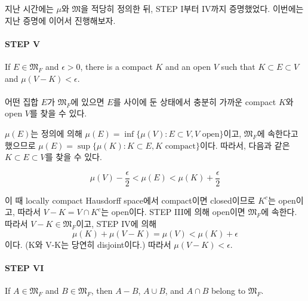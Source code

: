 \documentclass[11pt,reqno]{amsart}
\renewcommand{\(}{\left(}
\renewcommand{\)}{\right)}
\renewcommand{\[}{\left[}
\renewcommand{\]}{\right]}
\newcommand{\ep}{\epsilon}
\newcommand{\subheading}[1]{\vspace{1em}{\noindent\large\bfseries \textlangle{} #1 \textrangle{} \par}\vspace{1em}}
\newcommand{\M}{\mathfrak{M}}
\begin{document}
지난 시간에는 $\mu$와 $\M$을 적당히 정의한 뒤, STEP I부터 IV까지 증명했었다. 이번에는 지난 증명에 이어서 진행해보자.

\paragraph{STEP V}

If $E \in \M_F$ and $\ep > 0$, there is a compact $K$ and an open $V$ such that $K \subset E \subset V$ 
and $\mu (V - K) < \ep$. \\ \\

어떤 집합 $E$가 $\M_F$에 있으면 $E$를 사이에 둔 상태에서 충분히 가까운 compact $K$와 open $V$를 찾을 수 있다.

\subheading{proof}

$\mu(E)$는 정의에 의해 $\mu(E) = \inf\{ \mu(V) : E \subset V, V \text{ open} \}$이고, $\M_F$에 속한다고 했으므로 
$\mu(E) = \sup\{ \mu(K) : K \subset E, K \text{ compact} \}$이다. 따라서, 다음과 같은 
$K \subset E \subset V$를 찾을 수 있다.

\begin{equation*}
  \mu(V) - \frac{\ep}{2} < \mu(E) < \mu(K) + \frac{\ep}{2}
\end{equation*}

이 때 locally compact Hausdorff space에서 compact이면 closed이므로 $K^c$는 open이고, 따라서 
$V - K = V \cap K^c$는 open이다. STEP III에 의해 open이면 $\M_F$에 속한다. 따라서 $V - K \in \M_F$이고, 
STEP IV에 의해
\begin{equation*}
  \mu (K) + \mu(V-K) = \mu(V) < \mu(K) + \ep
\end{equation*}
이다. (K와 V-K는 당연히 disjoint이다.) 따라서 $\mu(V-K) < \ep$.

\paragraph{STEP VI}

If $A \in \M_F$ and $B \in \M_F$, then $A-B$, $A\cup B$, and $A \cap B$ belong to $\M_F$. \\ \\

\subheading{proof}
\end{document}
